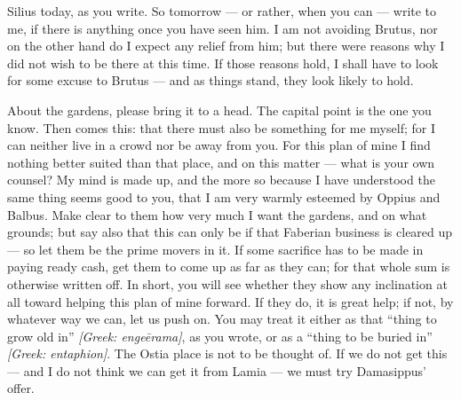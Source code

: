 

 Silius today, as you write. So tomorrow --- or rather, when you can --- write to me, if there is anything once you have seen him. I am not avoiding Brutus, nor on the other hand do I expect any relief from him; but there were reasons why I did not wish to be there at this time. If those reasons hold, I shall have to look for some excuse to Brutus --- and as things stand, they look likely to hold.

 About the gardens, please bring it to a head. The capital point is the one you know. Then comes this: that there must also be something for me myself; for I can neither live in a crowd nor be away from you. For this plan of mine I find nothing better suited than that place, and on this matter --- what is your own counsel? My mind is made up, and the more so because I have understood the same thing seems good to you, that I am very warmly esteemed by Oppius and Balbus. Make clear to them how very much I want the gardens, and on what grounds; but say also that this can only be if that Faberian business is cleared up --- so let them be the prime movers in it. If some sacrifice has to be made in paying ready cash, get them to come up as far as they can; for that whole sum is otherwise written off. In short, you will see whether they show any inclination at all toward helping this plan of mine forward. If they do, it is great help; if not, by whatever way we can, let us push on. You may treat it either as that ``thing to grow old in'' \textit{[Greek: enge\=erama]}, as you wrote, or as a ``thing to be buried in'' \textit{[Greek: entaphion]}. The Ostia place is not to be thought of. If we do not get this --- and I do not think we can get it from Lamia --- we must try Damasippus' offer.
